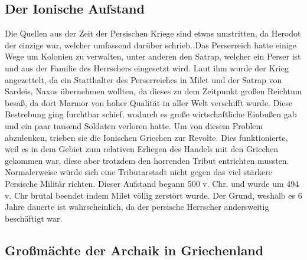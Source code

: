 \documentclass{article}
\begin{document}
	\subsection{Der Ionische Aufstand}
	Die Quellen aus der Zeit der Persischen Kriege sind etwas umstritten, da Herodot der einzige war, welcher umfassend darüber schrieb. Das Perserreich hatte einige Wege um Kolonien zu verwalten, unter anderen den Satrap, welcher ein Perser ist und aus der Familie des Herrschers eingesetzt wird. Laut ihm wurde der Krieg angezettelt, da ein Statthalter des Perserreiches in Milet und der Satrap von Sardeis, Naxos übernehmen wollten, da dieses zu dem Zeitpunkt großen Reichtum besaß, da dort Marmor von hoher Qualität in aller Welt verschifft wurde. Diese Bestrebung ging furchtbar schief, wodurch es große wirtschaftliche Einbußen gab und ein paar tausend Soldaten verloren hatte. Um von diesem Problem abzulenken, trieben sie die Ionischen Griechen zur Revolte. Dies funktionierte, weil es in dem Gebiet zum relativen Erliegen des Handels mit den Griechen gekommen war, diese aber trotzdem den horrenden Tribut entrichten mussten. Normalerweise würde sich eine Tributarstadt nicht gegen das viel stärkere Persische Militär richten. Dieser Aufstand begann 500 v. Chr. und wurde um 494 v. Chr brutal beendet indem Milet völlig zerstört wurde. Der Grund, weshalb es 6 Jahre dauerte ist wahrscheinlich, da der persische Herrscher andersweitig beschäftigt war. \\
	\subsection{Großmächte der Archaik in Griechenland}
\end{document}
